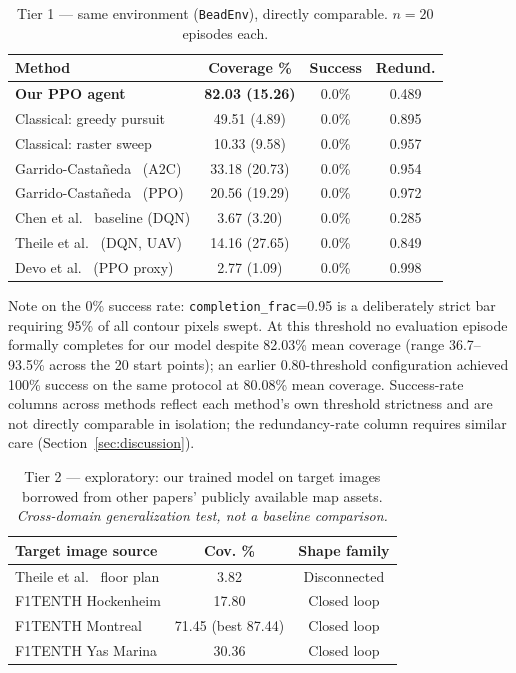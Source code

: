 \documentclass[conference]{IEEEtran}
\begin{document}
\begin{table}[t]
\centering
\caption{Tier 1 --- same environment (\texttt{BeadEnv}), directly comparable. $n=20$ episodes each.}
\label{tab:tier1}
\begin{tabular}{@{}lccc@{}}
\toprule
Method & Coverage \% & Success & Redund. \\
\midrule
\textbf{Our PPO agent} & \textbf{82.03 (15.26)} & 0.0\% & 0.489 \\
Classical: greedy pursuit & 49.51 (4.89) & 0.0\% & 0.895 \\
Classical: raster sweep & 10.33 (9.58) & 0.0\% & 0.957 \\
Garrido-Casta\~neda~\cite{garrido2025rlcpp} (A2C) & 33.18 (20.73) & 0.0\% & 0.954 \\
Garrido-Casta\~neda~\cite{garrido2025rlcpp} (PPO) & 20.56 (19.29) & 0.0\% & 0.972 \\
Chen et al.~\cite{chen2025redqn} baseline (DQN) & 3.67 (3.20) & 0.0\% & 0.285 \\
Theile et al.~\cite{theile2020uav} (DQN, UAV) & 14.16 (27.65) & 0.0\% & 0.849 \\
Devo et al.~\cite{devo2022autonomous} (PPO proxy) & 2.77 (1.09) & 0.0\% & 0.998 \\
\bottomrule
\end{tabular}
\end{table}

Note on the 0\% success rate: \texttt{completion\_frac}=0.95 is a deliberately strict bar requiring 95\% of all contour pixels swept. At this threshold no evaluation episode formally completes for our model despite 82.03\% mean coverage (range 36.7--93.5\% across the 20 start points); an earlier 0.80-threshold configuration achieved 100\% success on the same protocol at 80.08\% mean coverage. Success-rate columns across methods reflect each method's own threshold strictness and are not directly comparable in isolation; the redundancy-rate column requires similar care (Section~\ref{sec:discussion}).

\begin{table}[t]
\centering
\caption{Tier 2 --- exploratory: our trained model on target images borrowed from other papers' publicly available map assets. \emph{Cross-domain generalization test, not a baseline comparison.}}
\label{tab:tier2}
\begin{tabular}{@{}lcc@{}}
\toprule
Target image source & Cov. \% & Shape family \\
\midrule
Theile et al.~\cite{theile2024equivariant} floor plan & 3.82 & Disconnected \\
F1TENTH Hockenheim & 17.80 & Closed loop \\
F1TENTH Montreal & 71.45 (best 87.44) & Closed loop \\
F1TENTH Yas Marina & 30.36 & Closed loop \\
\bottomrule
\end{tabular}
\end{table}
\end{document}
